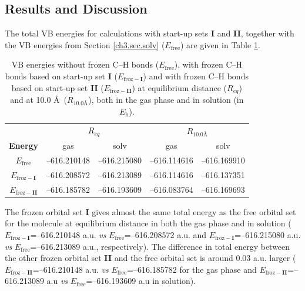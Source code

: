 \subsection{\label{ch3.sec.res.freez}Results and Discussion}

The total VB energies for calculations with start-up sets \textbf{I} and \textbf{II}, together with the VB energies from Section \ref{ch3.sec.solv} ($E_\mathrm{free}$) are given in Table \ref{ch3.tab.frozen}. 
\begin{table}[htp]
\center
\caption{VB energies without frozen C--H bonds ($E_\mathrm{free}$), with frozen C--H bonds based on
start-up set \textbf{I} ($E_\mathrm{froz-\textbf{I}}$) and with frozen C--H bonds based on start-up set \textbf{II}
($E_\mathrm{froz-\textbf{II}}$) at equilibrium distance ($R_{eq}$) and at 10.0 \AA\ ($R_{10.0 \text{\AA}}$),
both in the gas phase and in solution (in $E_\mathrm{h}$).}
\center
\begin{tabular}{|c|cc|cc|}
\hline
&\multicolumn{2}{c|}{$R_{eq}$}&\multicolumn{2}{c|}{$R_{10.0 \text{\AA}}$} \\
\textbf{Energy} & gas & solv & gas & solv \\
\hline
$E_\mathrm{free}$ & {--616.210148} & {--616.215080} & {--616.114616} & {--616.169910} \\
$E_\mathrm{froz-\textbf{I}}$& {--616.208572} & {--616.213089} & {--616.114616} & {--616.137351} \\
$E_\mathrm{froz-\textbf{II}}$& {--616.185782} & {--616.193609} & {--616.083764} & {--616.169693} \\
\hline
\end{tabular}
\label{ch3.tab.frozen}
\end{table}

The frozen orbital set \textbf{I} gives almost the same total energy as the free orbital set for the molecule at equilibrium distance in both the gas phase and in solution ($E_{\mathrm{froz}-\textbf{I}}$=--616.210148 a.u. \textit{vs} $E_\mathrm{free}$=--616.208572 a.u. and $E_{\mathrm{froz}-\textbf{I}}$=--616.215080 a.u. \textit{vs} $E_\mathrm{free}$=--616.213089 a.u., respectively). The difference in total energy between the other frozen orbital set \textbf{II} and the free orbital set is around 0.03 a.u. larger ($E_{\mathrm{froz}-\textbf{II}}$=--616.210148 a.u. \textit{vs} $E_\mathrm{free}$=--616.185782 for the gas phase and $E_{\mathrm{froz}-\textbf{II}}$=--616.213089 a.u \textit{vs} $E_\mathrm{free}$=--616.193609 a.u in solution).

